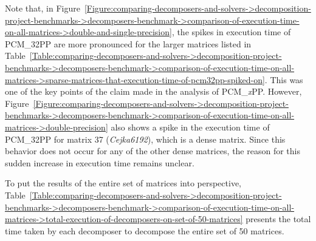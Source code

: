 Note that, in Figure~\ref{Figure:comparing-decomposers-and-solvers->decomposition-project-benchmarks->decomposers-benchmark->comparison-of-execution-time-on-all-matrices->double-and-single-precision}, the spikes in execution time of PCM\_32PP are more pronounced for the larger matrices listed in Table~\ref{Table:comparing-decomposers-and-solvers->decomposition-project-benchmarks->decomposers-benchmark->comparison-of-execution-time-on-all-matrices->sparse-matrices-that-execution-time-of-pcm32pp-spiked-on}.
This was one of the key points of the claim made in the analysis of PCM\_\textit{x}PP.
However, Figure~\ref{Figure:comparing-decomposers-and-solvers->decomposition-project-benchmarks->decomposers-benchmark->comparison-of-execution-time-on-all-matrices->double-precision} also shows a spike in the execution time of PCM\_32PP for matrix 37 (\textit{Cejka6192}), which is a dense matrix.
Since this behavior does not occur for any of the other dense matrices, the reason for this sudden increase in execution time remains unclear.

To put the results of the entire set of matrices into perspective, Table~\ref{Table:comparing-decomposers-and-solvers->decomposition-project-benchmarks->decomposers-benchmark->comparison-of-execution-time-on-all-matrices->total-execution-of-decomposers-on-set-of-50-matrices} presents the total time taken by each decomposer to decompose the entire set of 50 matrices.

